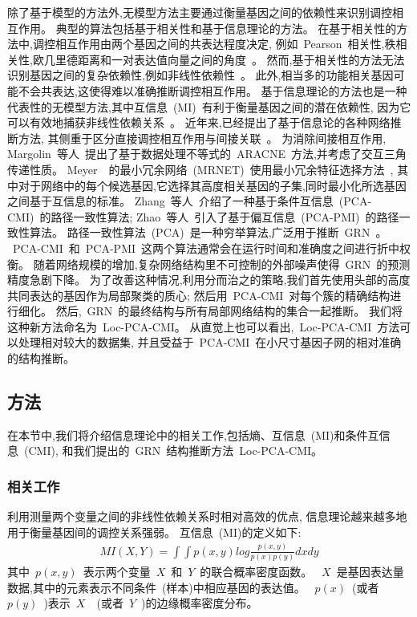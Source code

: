 除了基于模型的方法外,无模型方法主要通过衡量基因之间的依赖性来识别调控相互作用。
典型的算法包括基于相关性和基于信息理论的方法。
在基于相关性的方法中,调控相互作用由两个基因之间的共表达程度决定,
例如~Pearson~相关性,秩相关性,欧几里德距离和一对表达值向量之间的角度~\cite{wang2014review}。
然而,基于相关性的方法无法识别基因之间的复杂依赖性,例如非线性依赖性~\cite{ruyssinck2014nimefi}。
此外,相当多的功能相关基因可能不会共表达,这使得难以准确推断调控相互作用。
基于信息理论的方法也是一种代表性的无模型方法,其中互信息~(MI)~有利于衡量基因之间的潜在依赖性,
因为它可以有效地捕获非线性依赖关系~\cite{brunel2010miss,zhang2011inferring}。
近年来,已经提出了基于信息论的各种网络推断方法,
其侧重于区分直接调控相互作用与间接关联~\cite{marbach2010revealing}。
为消除间接相互作用,
Margolin~等人~\cite{margolin2006aracne}提出了基于数据处理不等式的~ARACNE~方法,并考虑了交互三角传递性质。
Meyer~\cite{meyer2007information}~的最小冗余网络~(MRNET)~使用最小冗余特征选择方法~\cite{peng2005feature},
其中对于网络中的每个候选基因,它选择其高度相关基因的子集,同时最小化所选基因之间基于互信息的标准。
Zhang~等人~\cite{zhang2011inferring}介绍了一种基于条件互信息~(PCA-CMI)~的路径一致性算法; 
Zhao~等人~\cite{zhao2016part}引入了基于偏互信息~(PCA-PMI)~的路径一致性算法。
路径一致性算法~(PCA)~是一种穷举算法,广泛用于推断~GRN~\cite{zhang2011inferring}。
~PCA-CMI~和~PCA-PMI~这两个算法通常会在运行时间和准确度之间进行折中权衡。
随着网络规模的增加,复杂网络结构里不可控制的外部噪声使得~GRN~的预测精度急剧下降。
为了改善这种情况,利用分而治之的策略,我们首先使用头部的高度共同表达的基因作为局部聚类的质心; 
然后用~PCA-CMI~对每个簇的精确结构进行细化。
然后,~GRN~的最终结构与所有局部网络结构的集合一起推断。
我们将这种新方法命名为~Loc-PCA-CMI。
从直觉上也可以看出,~Loc-PCA-CMI~方法可以处理相对较大的数据集,
并且受益于~PCA-CMI~在小尺寸基因子网的相对准确的结构推断。

\subsection{方法}
在本节中,我们将介绍信息理论中的相关工作,包括熵、互信息~(MI)和条件互信息~(CMI),
和我们提出的~GRN~结构推断方法~Loc-PCA-CMI。


\subsubsection{相关工作}
利用测量两个变量之间的非线性依赖关系时相对高效的优点,
信息理论越来越多地用于衡量基因间的调控关系强弱。
互信息~(MI)的定义如下:
\begin{align} %
    MI(X,Y)=\int \int p(x,y)log \frac{p(x,y)}{p(x)p(y)}dxdy
 \end{align}
 其中~$p(x,y)$~表示两个变量~$X$~和~$Y$~的联合概率密度函数。
~$X$~是基因表达量数据,其中的元素表示不同条件~(样本)中相应基因的表达值。
~$p(x)$~(或者~$p(y)$~)表示~$X$~~(或者~$Y$~)的边缘概率密度分布。

